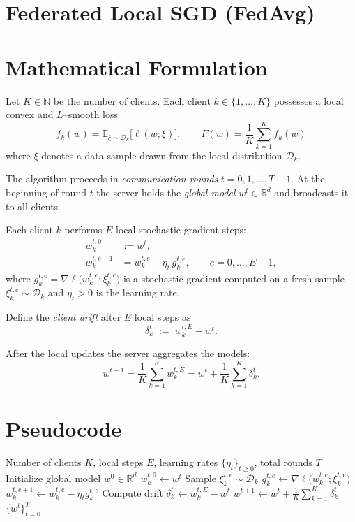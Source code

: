 \documentclass[11pt]{article}
\newcommand{\E}{\mathbb{E}}
\newcommand{\R}{\mathbb{R}}
\begin{document}
\section*{Federated Local SGD (FedAvg)}

\section*{Mathematical Formulation}
Let $K\in\mathbb{N}$ be the number of clients.  
Each client $k\in\{1,\dots,K\}$ possesses a local convex and $L$–smooth loss
\[
f_k(w)=\E_{\xi\sim\mathcal{D}_k}\bigl[\ell(w;\xi)\bigr],\qquad 
F(w)=\frac1K\sum_{k=1}^K f_k(w)
\]
where $\xi$ denotes a data sample drawn from the local distribution
$\mathcal{D}_k$.

The algorithm proceeds in \emph{communication rounds} $t=0,1,\dots,T-1$.
At the beginning of round $t$ the server holds the \emph{global model}
$w^{t}\in\R^{d}$ and broadcasts it to all clients.

Each client $k$ performs $E$ local stochastic gradient steps:
\[
\begin{aligned}
w_{k}^{t,0} &:= w^{t},\\[4pt]
w_{k}^{t,e+1} &= w_{k}^{t,e}
      -\eta_t\, g_{k}^{t,e},
      \qquad e=0,\dots,E-1,
\end{aligned}
\]
where $g_{k}^{t,e}= \nabla \ell\bigl(w_{k}^{t,e};\xi_{k}^{t,e}\bigr)$ is a stochastic
gradient computed on a fresh sample $\xi_{k}^{t,e}\sim\mathcal{D}_k$ and
$\eta_t>0$ is the learning rate.

Define the \emph{client drift} after $E$ local steps as
\[
\delta_{k}^{t} \;:=\; w_{k}^{t,E}-w^{t}.
\]

After the local updates the server aggregates the models:
\[
w^{t+1}= \frac1K\sum_{k=1}^{K} w_{k}^{t,E}
       = w^{t}+ \frac1K\sum_{k=1}^{K}\delta_{k}^{t}.
\tag{1}
\]

\section*{Pseudocode}
\begin{algorithm}[H]
\caption{Federated Local SGD (FedAvg)}
\begin{algorithmic}[1]
\Require Number of clients $K$, local steps $E$, learning rates $\{\eta_t\}_{t\ge0}$, total rounds $T$
\State Initialize global model $w^{0}\in\R^{d}$
        \State $w_{k}^{t,0}\gets w^{t}$
            \State Sample $\xi_{k}^{t,e}\sim\mathcal{D}_k$
            \State $g_{k}^{t,e}\gets \nabla\ell\bigl(w_{k}^{t,e};\xi_{k}^{t,e}\bigr)$
            \State $w_{k}^{t,e+1}\gets w_{k}^{t,e}-\eta_t g_{k}^{t,e}$
        \EndFor
        \State Compute drift $\delta_{k}^{t}\gets w_{k}^{t,E}-w^{t}$
    \EndFor
    \State $w^{t+1}\gets w^{t}+ \frac1K\sum_{k=1}^{K}\delta_{k}^{t}$ 
\EndFor
\State \Return $\{w^{t}\}_{t=0}^{T}$
\end{algorithmic}
\end{algorithm}
\end{document}
